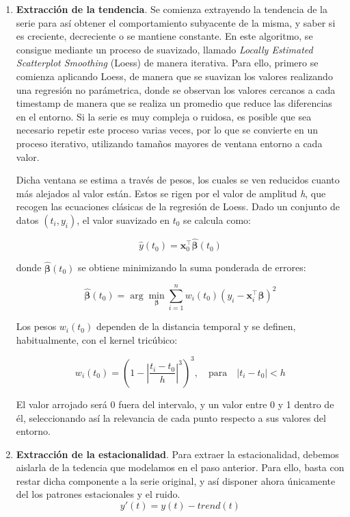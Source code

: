 \begin{enumerate}
	\item \textbf{Extracción de la tendencia}. Se comienza extrayendo la tendencia de la serie para así obtener el comportamiento subyacente de la misma, y saber si es creciente, decreciente o se mantiene constante. En este algoritmo, se consigue mediante un proceso de suavizado, llamado \textit{Locally Estimated Scatterplot Smoothing} (Loess) de manera iterativa. Para ello, primero se comienza aplicando Loess, de manera que se suavizan los valores realizando una regresión no parámetrica, donde se observan los valores cercanos a cada timestamp de manera que se realiza un promedio que reduce las diferencias en el entorno. Si la serie es muy compleja o ruidosa, es posible que sea necesario repetir este proceso varias veces, por lo que se convierte en un proceso iterativo, utilizando tamaños mayores de ventana entorno a cada valor.
	
	Dicha ventana se estima a través de pesos, los cuales se ven reducidos cuanto más alejados al valor están. Estos se rigen por el valor de amplitud \textit{h}, que recogen las ecuaciones clásicas de la regresión de Loess. Dado un conjunto de datos \((t_i, y_i)\), el valor suavizado en \( t_0 \) se calcula como:
	
	\[
	\hat{y}(t_0) = \mathbf{x}_0^\top \hat{\boldsymbol{\beta}}(t_0)
	\]
	
	donde \(\hat{\boldsymbol{\beta}}(t_0)\) se obtiene minimizando la suma ponderada de errores:
	
	\[
	\hat{\boldsymbol{\beta}}(t_0) = \arg\min_{\boldsymbol{\beta}} \sum_{i=1}^n w_i(t_0) \left(y_i - \mathbf{x}_i^\top \boldsymbol{\beta}\right)^2
	\]
	
	Los pesos \( w_i(t_0) \) dependen de la distancia temporal y se definen, habitualmente, con el kernel tricúbico:
	
	\[
	w_i(t_0) = \left(1 - \left|\frac{t_i - t_0}{h}\right|^3\right)^3, \quad \text{para} \quad |t_i - t_0| < h
	\]
	
	El valor arrojado será 0 fuera del intervalo, y un valor entre 0 y 1 dentro de él, seleccionando así la relevancia de cada punto respecto a sus valores del entorno.
	
	\item  \textbf{Extracción de la estacionalidad}. Para extraer la estacionalidad, debemos aislarla de la tedencia que modelamos en el paso anterior. Para ello, basta con restar dicha componente a la serie original, y así disponer ahora únicamente del los patrones estacionales y el ruido. 
	$$y'(t) = y(t) - trend(t)$$
	

\end{enumerate}
